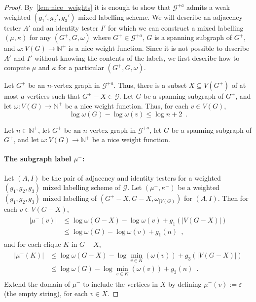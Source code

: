 \documentclass[twoside,leqno]{article}
\newcommand{\N}{\mathbb{N}}
\renewcommand{\le}{\leqslant}
\begin{document}
\begin{proof}
  By~\cref{lem:nice_weights} it is enough to show that $\mathcal{G}^{+a}$ admits a weak weighted $(g_1',g_2',g_3')$ mixed labelling scheme. We will describe an adjacency tester $A'$ and an identity tester $I'$ for which we can construct a mixed labelling $(\mu,\kappa)$ for any $(G^+,G,\omega)$ where $G^+\in \mathcal{G}^{+a}$, $G$ is a spanning subgraph of $G^+$, and $\omega:V(G)\to\N^+$ is a nice weight function.
  Since it is not possible to describe $A'$ and $I'$ without knowing the contents of the labels, we first describe how to compute $\mu$ and $\kappa$ for a particular $(G^+,G,\omega)$.

  Let $G^+$ be an $n$-vertex graph in $\mathcal{G}^{+a}$.  Thus, there is a subset $X\subseteq V(G^+)$ of at most $a$ vertices such that $G^+-X\in\mathcal{G}$.  Let $G$ be a spanning subgraph of $G^+$, and let $\omega:V(G)\to\N^+$ be a nice weight function.
  Thus, for each $v\in V(G)$,
  \begin{equation}
    \log\omega(G)-\log\omega(v)\le\log n + 2\enspace.
  \end{equation}

  Let $n\in \N^+$,
  let $G^+$ be an $n$-vertex graph in $\mathcal{G}^{+a}$,    let $G$ be a spanning subgraph of $G^+$,    and
  let $\omega:V(G)\to\N^+$ be a nice weight function.

  \paragraph{The subgraph label $\mu^-$:}
  Let $(A,I)$ be the pair of adjacency and identity testers for a weighted $(g_1,g_2,g_3)$ mixed labelling scheme of $\mathcal{G}$.
  Let $(\mu^-,\kappa^-)$ be a weighted $(g_1,g_2,g_3)$ mixed labelling of $(G^+-X, G-X,\omega_{|V(G)})$ for $(A,I)$.
  Then for each $v\in V(G-X)$,
  \begin{align}
    \begin{split}
      |\mu^-(v)|
       & \le \log\omega(G-X) -\log\omega(v)+g_1(|V(G-X)|) \\
       & \le \log\omega(G)-\log\omega(v)+g_1(n) \enspace,
    \end{split}
    \label{eq:mu-}
  \end{align}
  and for each clique $K$ in $G-X$,
  \begin{align}
    \label{eq:split}
    \begin{split}
      |\mu^-(K)|
       & \le \log\omega(G-X)-\log\min_{v\in K}(\omega(v))+g_3(|V(G-X)|)  \\
       & \le \log\omega(G)-\log\min_{v\in K}(\omega(v))+g_3(n) \enspace.
    \end{split}
  \end{align}
  Extend the domain of $\mu^-$ to include the vertices in $X$ by defining $\mu^-(v):=\varepsilon$ (the empty string), for each $v\in X$.


\end{proof}
\end{document}
